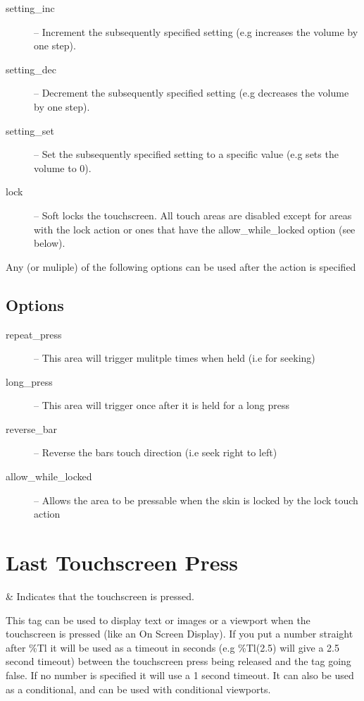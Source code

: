 {\begin{description}
    \item[setting\_inc] -- Increment the subsequently specified setting (e.g
       increases the volume by one step).
    \item[setting\_dec] -- Decrement the subsequently specified setting (e.g
       decreases the volume by one step).
    \item[setting\_set] -- Set the subsequently specified setting to a specific value (e.g
       sets the volume to 0).
    \item[lock] -- Soft locks the touchscreen.  All touch areas are disabled except for
        areas with the lock action or ones that have the allow\_while\_locked option (see below).
  \end{description}
  Any (or muliple) of the following options can be used after the action is specified
  \subsection{Options}
  \begin{description}
    \item[repeat\_press] -- This area will trigger mulitple times when held (i.e for seeking)
    \item[long\_press] -- This area will trigger once after it is held for a long press
    \item[reverse\_bar] -- Reverse the bars touch direction (i.e seek right to left)
    \item[allow\_while\_locked] -- Allows the area to be pressable when the
        skin is locked by the lock touch action
  \end{description}

  \section{Last Touchscreen Press}
    \begin{tagmap}
       & Indicates that the touchscreen is pressed.\\
    \end{tagmap}
  This tag can be used to display text or images or a viewport when the
  touchscreen is pressed (like an On Screen Display). If you put a number
  straight after \%Tl it will be used as a timeout in seconds
  (e.g \%Tl(2.5) will give a 2.5 second timeout) between the touchscreen press
  being released and the tag going false. If no number is specified it will
  use a 1 second timeout.  It can also be used as a conditional, and can be
  used with conditional viewports.
}


